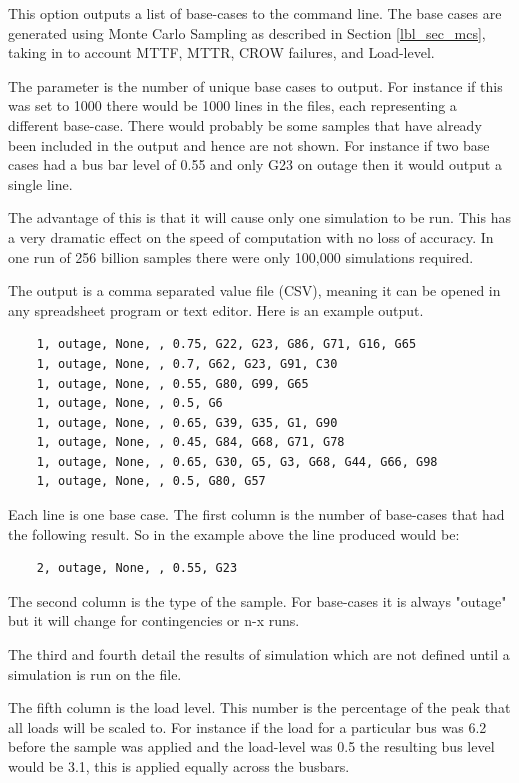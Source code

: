 \documentclass[a4paper,oneside,12pt]{report}
\begin{document}
This option outputs a list of base-cases to the command line. The base cases are generated using Monte Carlo Sampling as described in Section \ref{lbl_sec_mcs}, taking in to account MTTF, MTTR, CROW failures, and Load-level.

The parameter is the number of unique base cases to output. For instance if this was set to 1000 there would be 1000 lines in the files, each representing a different base-case. There would probably be some samples that have already been included in the output and hence are not shown. For instance if two base cases had a bus bar level of 0.55 and only G23 on outage then it would output a single line.

The advantage of this is that it will cause only one simulation to be run. This has a very dramatic effect on the speed of computation with no loss of accuracy. In one run of 256 billion samples there were only 100,000 simulations required.

The output is a comma separated value file (CSV), meaning it can be opened in any spreadsheet program or text editor. Here is an example output.

\begin{verbatim}
    1, outage, None, , 0.75, G22, G23, G86, G71, G16, G65
    1, outage, None, , 0.7, G62, G23, G91, C30
    1, outage, None, , 0.55, G80, G99, G65
    1, outage, None, , 0.5, G6
    1, outage, None, , 0.65, G39, G35, G1, G90
    1, outage, None, , 0.45, G84, G68, G71, G78
    1, outage, None, , 0.65, G30, G5, G3, G68, G44, G66, G98
    1, outage, None, , 0.5, G80, G57
\end{verbatim}

Each line is one base case. The first column is the number of base-cases that had the following result. So in the example above the line produced would be:

\begin{verbatim}
    2, outage, None, , 0.55, G23
\end{verbatim}

The second column is the type of the sample. For base-cases it is always "outage" but it will change for contingencies or n-x runs.

The third and fourth detail the results of simulation which are not defined until a simulation is run on the file.

The fifth column is the load level. This number is the percentage of the peak that all loads will be scaled to. For instance if the load for a particular bus was 6.2 before the sample was applied and the load-level was 0.5 the resulting bus level would be 3.1, this is applied equally across the busbars.
\end{document}

